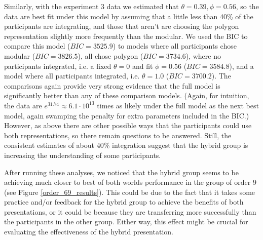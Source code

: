 \documentclass[man,10pt]{apa6}
\begin{document}
Similarly, with the experiment 3 data we estimated that $\theta = 0.39, \phi = 0.56$, so the data are best fit under this model by assuming that a little less than 40\% of the participants are integrating, and those that aren't are choosing the polygon representation slightly more frequently than the modular. We used the BIC to compare this model ($BIC = 3525.9$) to models where all participants chose modular ($BIC=3826.5$), all chose polygon ($BIC = 3734.6$), where no participants integrated, i.e. a fixed $\theta = 0$ and fit $\phi = 0.56$ ($BIC = 3584.8$), and a model where all participants integrated, i.e. $\theta = 1.0$ ($BIC = 3700.2$). The comparisons again provide very strong evidence that the full model is significantly better than any of these comparison models. (Again, for intuition, the data are $e^{31.74} \approx 6.1 \cdot 10^{13}$ times as likely under the full model as the next best model, again swamping the penalty for extra parameters included in the BIC.) However, as above there are other possible ways that the participants could use both representations, so there remain questions to be answered. Still, the consistent estimates of about 40\% integration suggest that the hybrid group is increasing the understanding of some participants.\par
After running these analyses, we noticed that the hybrid group seems to be achieving much closer to best of both worlds performance in the group of order 9 (see Figure \ref{order_69_results}). This could be due to the fact that it takes some practice and/or feedback for the hybrid group to achieve the benefits of both presentations, or it could be because they are transferring more successfully than the participants in the other group. Either way, this effect might be crucial for evaluating the effectiveness of the hybrid presentation. \par
\end{document}
